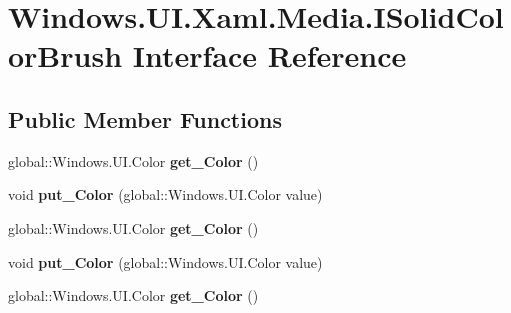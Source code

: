 \hypertarget{interface_windows_1_1_u_i_1_1_xaml_1_1_media_1_1_i_solid_color_brush}{}\section{Windows.\+U\+I.\+Xaml.\+Media.\+I\+Solid\+Color\+Brush Interface Reference}
\label{interface_windows_1_1_u_i_1_1_xaml_1_1_media_1_1_i_solid_color_brush}
\subsection*{Public Member Functions}
\begin{DoxyCompactItemize}
\item 
\mbox{\label{interface_windows_1_1_u_i_1_1_xaml_1_1_media_1_1_i_solid_color_brush_a709fba8664ac89aa1efe18331e59ece7}} 
global\+::\+Windows.\+U\+I.\+Color {\bfseries get\+\_\+\+Color} ()
\item 
\mbox{\label{interface_windows_1_1_u_i_1_1_xaml_1_1_media_1_1_i_solid_color_brush_adcc88b29f014d931f231fe7e2cdf27cc}} 
void {\bfseries put\+\_\+\+Color} (global\+::\+Windows.\+U\+I.\+Color value)
\item 
\mbox{\label{interface_windows_1_1_u_i_1_1_xaml_1_1_media_1_1_i_solid_color_brush_a709fba8664ac89aa1efe18331e59ece7}} 
global\+::\+Windows.\+U\+I.\+Color {\bfseries get\+\_\+\+Color} ()
\item 
\mbox{\label{interface_windows_1_1_u_i_1_1_xaml_1_1_media_1_1_i_solid_color_brush_adcc88b29f014d931f231fe7e2cdf27cc}} 
void {\bfseries put\+\_\+\+Color} (global\+::\+Windows.\+U\+I.\+Color value)
\item 
\mbox{\label{interface_windows_1_1_u_i_1_1_xaml_1_1_media_1_1_i_solid_color_brush_a709fba8664ac89aa1efe18331e59ece7}} 
global\+::\+Windows.\+U\+I.\+Color {\bfseries get\+\_\+\+Color} ()
\item 

\end{DoxyCompactItemize}
